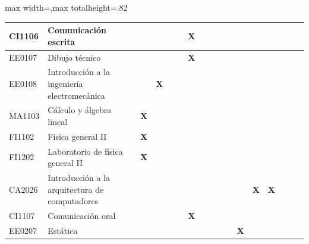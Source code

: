 \begin{center}
\begin{adjustbox}{max width=\textwidth,max totalheight=.82\textheight}
\begin{tabular}{|l|p{4.6cm}|c|c|c|c|c|c|c|c|c|c|c|c|c|c|c|}
CI1106 & Comunicación escrita & \textbf{ } & \textbf{ } & \textbf{ } & \textbf{ } & \textbf{X} & \textbf{ } & \textbf{ } & \textbf{ } & \textbf{ } & \textbf{ } & \textbf{ } & \textbf{ } & \textbf{ } & \textbf{ } & \textbf{ } \\ \hline
\rowcolor{azulTabla}
EE0107 & Dibujo técnico & \textbf{ } & \textbf{ } & \textbf{ } & \textbf{ } & \textbf{X} & \textbf{ } & \textbf{ } & \textbf{ } & \textbf{ } & \textbf{ } & \textbf{ } & \textbf{ } & \textbf{ } & \textbf{ } & \textbf{ } \\ \hline
EE0108 & Introducción a la ingeniería electromecánica & \textbf{ } & \textbf{X} & \textbf{ } & \textbf{ } & \textbf{ } & \textbf{ } & \textbf{ } & \textbf{ } & \textbf{ } & \textbf{ } & \textbf{ } & \textbf{ } & \textbf{ } & \textbf{ } & \textbf{ } \\ \hline
\rowcolor{azulTabla}
MA1103 & Cálculo y álgebra lineal & \textbf{X} & \textbf{ } & \textbf{ } & \textbf{ } & \textbf{ } & \textbf{ } & \textbf{ } & \textbf{ } & \textbf{ } & \textbf{ } & \textbf{ } & \textbf{ } & \textbf{ } & \textbf{ } & \textbf{ } \\ \hline
FI1102 & Física general II & \textbf{X} & \textbf{ } & \textbf{ } & \textbf{ } & \textbf{ } & \textbf{ } & \textbf{ } & \textbf{ } & \textbf{ } & \textbf{ } & \textbf{ } & \textbf{ } & \textbf{ } & \textbf{ } & \textbf{ } \\ \hline
\rowcolor{azulTabla}
FI1202 & Laboratorio de física general II & \textbf{X} & \textbf{ } & \textbf{ } & \textbf{ } & \textbf{ } & \textbf{ } & \textbf{ } & \textbf{ } & \textbf{ } & \textbf{ } & \textbf{ } & \textbf{ } & \textbf{ } & \textbf{ } & \textbf{ } \\ \hline
CA2026 & Introducción a la arquitectura de computadores & \textbf{ } & \textbf{ } & \textbf{ } & \textbf{ } & \textbf{ } & \textbf{ } & \textbf{ } & \textbf{ } & \textbf{ } & \textbf{ } & \textbf{X} & \textbf{X} & \textbf{ } & \textbf{ } & \textbf{ } \\ \hline
\rowcolor{azulTabla}
CI1107 & Comunicación oral & \textbf{ } & \textbf{ } & \textbf{ } & \textbf{ } & \textbf{X} & \textbf{ } & \textbf{ } & \textbf{ } & \textbf{ } & \textbf{ } & \textbf{ } & \textbf{ } & \textbf{ } & \textbf{ } & \textbf{ } \\ \hline
EE0207 & Estática & \textbf{ } & \textbf{ } & \textbf{ } & \textbf{ } & \textbf{ } & \textbf{ } & \textbf{ } & \textbf{ } & \textbf{ } & \textbf{X} & \textbf{ } & \textbf{ } & \textbf{ } & \textbf{ } & \textbf{ } \\ \hline

\end{tabular}
\end{adjustbox}
\end{center}

